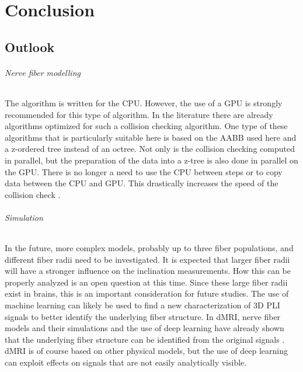 \newpage\null\thispagestyle{empty}\newpage
\clearpage{\thispagestyle{empty}\cleardoublepage}
\part{Conclusion}
% 
% 
% 
\setcounter{chapter}{8}
\chapter{Outlook}
\label{sec:outlook}
% 
% 
\paragraph{Nerve fiber modelling}
% 
The algorithm is written for the \ac{CPU}.
However, the use of a \ac{GPU} is strongly recommended for this type of algorithm.
In the literature there are already algorithms optimized for such a collision checking algorithm.
One type of these algorithms that is particularly suitable here is based on the \ac{AABB} used here and a z-ordered tree instead of an octree.
Not only is the collision checking computed in parallel, but the preparation of the data into a z-tree is also done in parallel on the \ac{GPU}.
There is no longer a need to use the \ac{CPU} between steps or to copy data between the \ac{CPU} and \ac{GPU}.
This drastically increases the speed of the collision check \cite{Karras2012}. 
% 
% 
% 
\paragraph{Simulation}
% 
In the future, more complex models, probably up to three fiber populations, and different fiber radii need to be investigated.
It is expected that larger fiber radii will have a stronger influence on the inclination measurements.
How this can be properly analyzed is an open question at this time.
Since these large fiber radii exist in brains, this is an important consideration for future studies.
The use of machine learning can likely be used to find a new characterization of 3D PLI signals to better identify the underlying fiber structure.
In \ac{dMRI}, nerve fiber models and their simulations and the use of deep learning have already shown that the underlying fiber structure can be identified from the original signals \cite{ginsburgerDis2019}.
\ac{dMRI} is of course based on other physical models, but the use of deep learning can exploit effects on signals that are not easily analytically visible.
% 
% 
% 
% 
% 
